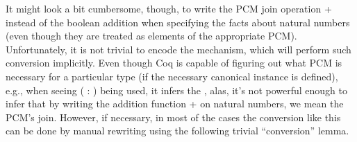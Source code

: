 It might look a bit cumbersome, though, to write the PCM join
operation + instead of the boolean addition when specifying the
facts about natural numbers (even though they are treated as elements
of the appropriate PCM). Unfortunately, it is not trivial to encode
the mechanism, which will perform such conversion implicitly. Even
though Coq is capable of figuring out what PCM is necessary for a
particular type (if the necessary canonical instance is defined),
e.g., when seeing (  : ) being used, it infers the ,
alas, it's not powerful enough to infer that by writing the
addition function + on natural numbers, we mean the PCM's
join. However, if necessary, in most of the cases the conversion like
this can be done by manual rewriting using the following trivial
``conversion'' lemma.


